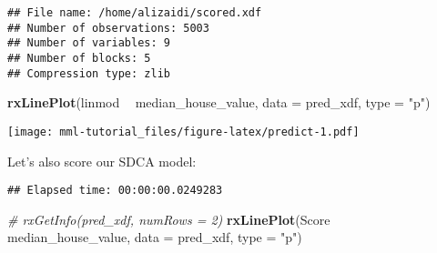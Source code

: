 \documentclass[]{book}
\newenvironment{Shaded}{\begin{snugshade}}{\end{snugshade}}
\newcommand{\KeywordTok}[1]{\textcolor[rgb]{0.13,0.29,0.53}{\textbf{#1}}}
\newcommand{\DataTypeTok}[1]{\textcolor[rgb]{0.13,0.29,0.53}{#1}}
\newcommand{\StringTok}[1]{\textcolor[rgb]{0.31,0.60,0.02}{#1}}
\newcommand{\CommentTok}[1]{\textcolor[rgb]{0.56,0.35,0.01}{\textit{#1}}}
\newcommand{\OperatorTok}[1]{\textcolor[rgb]{0.81,0.36,0.00}{\textbf{#1}}}
\newcommand{\NormalTok}[1]{#1}
\theoremstyle{definition}
\theoremstyle{definition}
\theoremstyle{definition}
\theoremstyle{remark}
\begin{document}
\begin{Shaded}
\end{Shaded}

\begin{verbatim}
## File name: /home/alizaidi/scored.xdf 
## Number of observations: 5003 
## Number of variables: 9 
## Number of blocks: 5 
## Compression type: zlib
\end{verbatim}

\begin{Shaded}
\begin{Highlighting}[]
\KeywordTok{rxLinePlot}\NormalTok{(linmod }\OperatorTok{~}\StringTok{ }\NormalTok{median_house_value, }\DataTypeTok{data =}\NormalTok{ pred_xdf, }\DataTypeTok{type =} \StringTok{"p"}\NormalTok{)}
\end{Highlighting}
\end{Shaded}

\texttt{[image: mml-tutorial\_files/figure-latex/predict-1.pdf]}

Let's also score our SDCA model:

\begin{Shaded}
\end{Shaded}

\begin{verbatim}
## Elapsed time: 00:00:00.0249283
\end{verbatim}

\begin{Shaded}
\begin{Highlighting}[]
\CommentTok{# rxGetInfo(pred_xdf, numRows = 2)}
\KeywordTok{rxLinePlot}\NormalTok{(Score }\OperatorTok{~}\StringTok{ }\NormalTok{median_house_value, }\DataTypeTok{data =}\NormalTok{ pred_xdf, }\DataTypeTok{type =} \StringTok{"p"}\NormalTok{)}
\end{Highlighting}
\end{Shaded}
\end{document}

